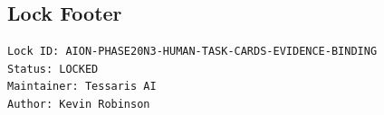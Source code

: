\subsection{Lock Footer}

\begin{verbatim}
Lock ID: AION-PHASE20N3-HUMAN-TASK-CARDS-EVIDENCE-BINDING
Status: LOCKED
Maintainer: Tessaris AI
Author: Kevin Robinson
\end{verbatim}
